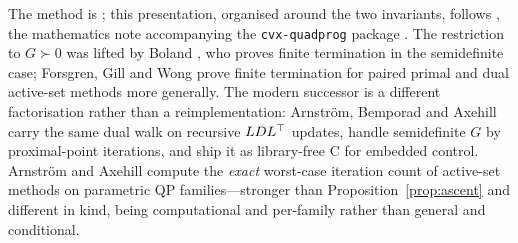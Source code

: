 \begin{notes}
The method is \cite{goldfarb1982,goldfarb1983}; this presentation, organised around
the two invariants, follows \cite{schmelzer2026quadprog}, the mathematics note
accompanying the \texttt{cvx-quadprog} package \cite{cvxquadprog}. The restriction to $G \succ 0$ was
lifted by Boland \cite{boland1997}, who proves finite termination in the
semidefinite case; Forsgren, Gill and Wong \cite{forsgren2016} prove finite
termination for paired primal and dual active-set methods more generally. The modern
successor is a different factorisation rather than a reimplementation: Arnström,
Bemporad and Axehill \cite{arnstrom2022daqp} carry the same dual walk on recursive
$LDL^{\top}$ updates, handle semidefinite $G$ by proximal-point iterations, and ship it as
library-free C for embedded control. Arnström and Axehill
\cite{arnstrom2022certification} compute the \emph{exact} worst-case iteration count
of active-set methods on parametric QP families---stronger than
Proposition~\ref{prop:ascent} and different in kind, being computational and
per-family rather than general and conditional.
\end{notes}


